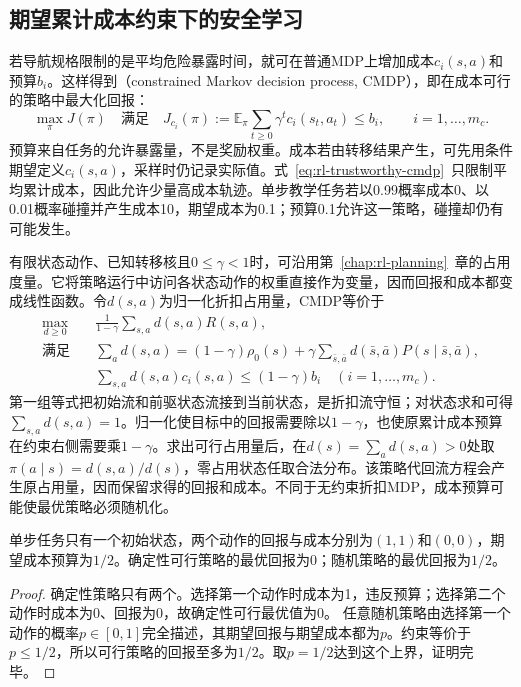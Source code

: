 \subsection{期望累计成本约束下的安全学习}
\label{sec:rl-trustworthy-cmdp}

若导航规格限制的是平均危险暴露时间，就可在普通MDP上增加成本$c_i(s,a)$和预算$b_i$。这样得到（constrained Markov decision process, CMDP），即在成本可行的策略中最大化回报：
\begin{equation}
  \max_\pi J(\pi)
  \quad\text{满足}\quad
  J_{c_i}(\pi):=\mathbb E_\pi\sum_{t\geq0}\gamma^tc_i(s_t,a_t)
       \leq b_i,\qquad i=1,\ldots,m_c.
  \label{eq:rl-trustworthy-cmdp}
\end{equation}
预算来自任务的允许暴露量，不是奖励权重。成本若由转移结果产生，可先用条件期望定义$c_i(s,a)$，采样时仍记录实际值。式~\eqref{eq:rl-trustworthy-cmdp}~只限制平均累计成本，因此允许少量高成本轨迹。单步教学任务若以0.99概率成本0、以0.01概率碰撞并产生成本10，期望成本为0.1；预算0.1允许这一策略，碰撞却仍有可能发生。

有限状态动作、已知转移核且$0\leq\gamma<1$时，可沿用第~\ref{chap:rl-planning}~章的占用度量。它将策略运行中访问各状态动作的权重直接作为变量，因而回报和成本都变成线性函数。令$d(s,a)$为归一化折扣占用量，CMDP等价于
\begin{align}
  \max_{d\geq0}\quad&
       \frac{1}{1-\gamma}\sum_{s,a}d(s,a)R(s,a), \nonumber\\
  \text{满足}\quad&
       \sum_a d(s,a)
       =(1-\gamma)\rho_0(s)
          +\gamma\sum_{\bar s,\bar a}d(\bar s,\bar a)
                   P(s\mid\bar s,\bar a), \nonumber\\
  &\sum_{s,a}d(s,a)c_i(s,a)\leq(1-\gamma)b_i
       \quad (i=1,\ldots,m_c).
  \label{eq:rl-trustworthy-cmdp-lp}
\end{align}
第一组等式把初始流和前驱状态流接到当前状态，是折扣流守恒；对状态求和可得$\sum_{s,a}d(s,a)=1$。归一化使目标中的回报需要除以$1-\gamma$，也使原累计成本预算在约束右侧需要乘$1-\gamma$。求出可行占用量后，在$d(s)=\sum_a d(s,a)>0$处取
$\pi(a\mid s)=d(s,a)/d(s)$，零占用状态任取合法分布。该策略代回流方程会产生原占用量，因而保留求得的回报和成本。不同于无约束折扣MDP，成本预算可能使最优策略必须随机化。

\begin{theorem}[约束最优可能需要随机化]
  \label{thm:rl-trustworthy-randomization}
  单步任务只有一个初始状态，两个动作的回报与成本分别为$(1,1)$和$(0,0)$，期望成本预算为$1/2$。确定性可行策略的最优回报为0；随机策略的最优回报为$1/2$。
\end{theorem}
\begin{proof}
  确定性策略只有两个。选择第一个动作时成本为1，违反预算；选择第二个动作时成本为0、回报为0，故确定性可行最优值为0。
  任意随机策略由选择第一个动作的概率$p\in[0,1]$完全描述，其期望回报与期望成本都为$p$。约束等价于$p\leq1/2$，所以可行策略的回报至多为$1/2$。取$p=1/2$达到这个上界，证明完毕。
\end{proof}

